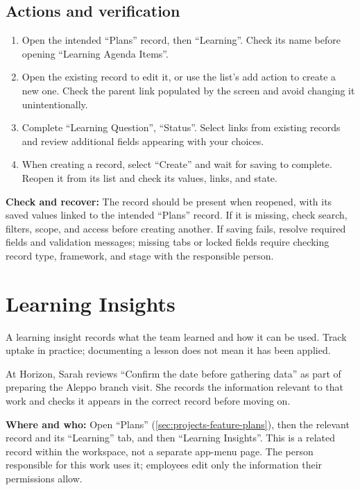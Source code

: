 \subsection{Actions and verification}
\begin{enumerate}
\item Open the intended “Plans” record, then “Learning”. Check its name before opening “Learning Agenda Items”.
\item Open the existing record to edit it, or use the list's add action to create a new one. Check the parent link populated by the screen and avoid changing it unintentionally.
\item Complete “Learning Question”, “Status”. Select links from existing records and review additional fields appearing with your choices.
\item When creating a record, select “Create” and wait for saving to complete. Reopen it from its list and check its values, links, and state.
\end{enumerate}

\textbf{Check and recover:} The record should be present when reopened, with its saved values linked to the intended “Plans” record. If it is missing, check search, filters, scope, and access before creating another. If saving fails, resolve required fields and validation messages; missing tabs or locked fields require checking record type, framework, and stage with the responsible person.

\clearpage
\section{Learning Insights}
\label{sec:projects-feature-planning-learning-insights}

A learning insight records what the team learned and how it can be used. Track uptake in practice; documenting a lesson does not mean it has been applied.

\begin{rcnote}
At Horizon, Sarah reviews “Confirm the date before gathering data” as part of preparing the Aleppo branch visit. She records the information relevant to that work and checks it appears in the correct record before moving on.
\end{rcnote}

\textbf{Where and who:} Open “Plans” (\ref{sec:projects-feature-plans}), then the relevant record and its “Learning” tab, and then “Learning Insights”. This is a related record within the workspace, not a separate app-menu page. The person responsible for this work uses it; employees edit only the information their permissions allow.


